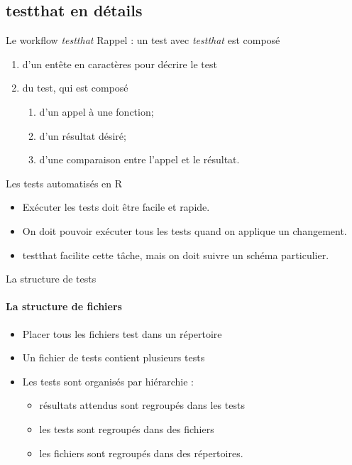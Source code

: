 \documentclass[11pt]{beamer}
\begin{document}
\subsection{testthat en détails}

\begin{frame}{Le workflow \textit{testthat}}
Rappel : un test avec \textit{testthat} est composé

\begin{enumerate}
\item d'un entête en caractères pour décrire le test
\item du test, qui est composé
\begin{enumerate}
\item d'un appel à une fonction;
\item d'un résultat désiré;
\item d'une comparaison entre l'appel et le résultat.
\end{enumerate}
\end{enumerate}
\end{frame}

\begin{frame}{Les tests automatisés en R}
\begin{itemize}
\item Exécuter les tests doit être facile et rapide.
\item On doit pouvoir exécuter tous les tests quand on applique un changement.
\item testthat facilite cette tâche, mais on doit suivre un schéma particulier.
\end{itemize}
\end{frame}

\begin{frame}{La structure de tests}
\framesubtitle{La structure de fichiers}
\begin{itemize}
\item Placer tous les fichiers test dans un répertoire
\item Un fichier de tests contient plusieurs tests
\item Les tests sont organisés par hiérarchie :
\begin{itemize}
    \item résultats attendus sont regroupés dans les tests
    \item les tests sont regroupés dans des fichiers
    \item les fichiers sont regroupés dans des répertoires.
\end{itemize}
\end{itemize}
\end{frame}
\end{document}

